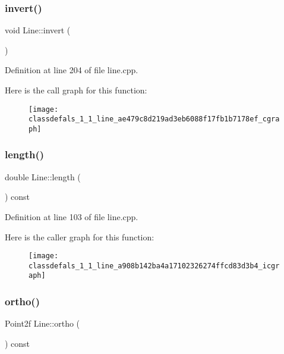 \subsubsection{\texorpdfstring{invert()}{invert()}}
{\footnotesize\ttfamily void Line\+::invert (\begin{DoxyParamCaption}{ }\end{DoxyParamCaption})}



Definition at line 204 of file line.\+cpp.

Here is the call graph for this function\+:\nopagebreak
\begin{figure}[H]
\begin{center}
\leavevmode
\texttt{[image: classdefals\_1\_1\_line\_ae479c8d219ad3eb6088f17fb1b7178ef\_cgraph]}
\end{center}
\end{figure}
\mbox{\label{classdefals_1_1_line_a908b142ba4a17102326274ffcd83d3b4}} 
\subsubsection{\texorpdfstring{length()}{length()}}
{\footnotesize\ttfamily double Line\+::length (\begin{DoxyParamCaption}{ }\end{DoxyParamCaption}) const}



Definition at line 103 of file line.\+cpp.

Here is the caller graph for this function\+:\nopagebreak
\begin{figure}[H]
\begin{center}
\leavevmode
\texttt{[image: classdefals\_1\_1\_line\_a908b142ba4a17102326274ffcd83d3b4\_icgraph]}
\end{center}
\end{figure}
\mbox{\label{classdefals_1_1_line_a90312d4ec4bb1b1ea65c7f8abe6383f3}} 
\subsubsection{\texorpdfstring{ortho()}{ortho()}}
{\footnotesize\ttfamily Point2f Line\+::ortho (\begin{DoxyParamCaption}{ }\end{DoxyParamCaption}) const\hspace{0.3cm}{\ttfamily [private]}}




